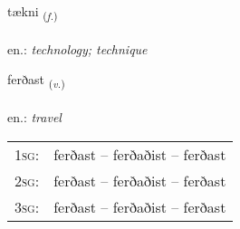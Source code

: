 \documentclass[frontgrid, backgrid]{flacards}\usepackage[]{graphicx}\usepackage[]{xcolor}
\begin{document}
\renewcommand{\flhead}{\vskip5pt \fboxsep=0pt {\small\bfseries\footnotesize Nafnorð | Noun}}
\renewcommand{\fcfoot}{\vskip5pt \fboxsep=0pt \hspace{2pt}{\small\bfseries\footnotesize 2K}}

\renewcommand{\blhead}{\vskip5pt {\small\bfseries\footnotesize Nafnorð | Noun }}
\renewcommand{\bcfoot}{\vskip5pt \hspace{2pt}{\small\bfseries\footnotesize 2K}}


{tækni \small{\textsubscript{(\textit{f.})}} \\[1ex] %
\textphonetic{[tʰaihknɪ]} \\
en.: \emph{technology; technique} \\  [2ex]
\renewcommand*{\arraystretch}{0.8}
}

\renewcommand{\flhead}{\vskip5pt \fboxsep=0pt {\small\bfseries\footnotesize Sagnorð | Verb}}
\renewcommand{\fcfoot}{\vskip5pt \fboxsep=0pt \hspace{2pt}{\small\bfseries\footnotesize 2K}}

\renewcommand{\blhead}{\vskip5pt {\small\bfseries\footnotesize Sagnorð | Verb }}
\renewcommand{\bcfoot}{\vskip5pt \hspace{2pt}{\small\bfseries\footnotesize 2K}}


{ferðast \small{\textsubscript{(\textit{v.})}} \\[1ex] %
\textphonetic{[fɛrðast]} \\
en.: \emph{travel} \\  [2ex]
\renewcommand*{\arraystretch}{0.8}
\begin{tabular}{p{1cm}l}
\textsc{1sg}: & ferðast -- ferðaðist -- ferðast \\ 
\textsc{2sg}: & ferðast -- ferðaðist -- ferðast \\ 
\textsc{3sg}: & ferðast -- ferðaðist -- ferðast \\ 
\end{tabular}
}
\end{document}
